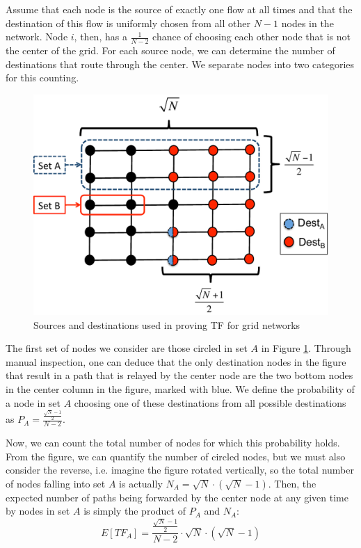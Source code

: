 Assume that each node is the source of exactly one flow at all times and that the destination of this flow is uniformly chosen from all other $N-1$ nodes in the network.  Node $i$, then, has a $\frac{1}{N-2}$ chance of choosing each other node that is not the center of the grid.  For each source node, we can determine the number of destinations that route through the center.  We separate nodes into two categories for this counting.

\begin{figure}
\begin{centering}
    \includegraphics[scale=0.33]{figures/TF_proof_fig_color.pdf}
    \vspace{-4mm}
    \caption{Sources and destinations used in proving TF for grid networks}
    \label{fig:TF_proof_fig}
    \vspace{-6mm}
\end{centering}
\end{figure}

The first set of nodes we consider are those circled in set $A$ in Figure \ref{fig:TF_proof_fig}.  Through manual inspection, one can deduce that the only destination nodes in the figure that result in a path that is relayed by the center node are the two bottom nodes in the center column in the figure, marked with blue.  We define the probability of a node in set $A$ choosing one of these destinations from all possible destinations as $P_{A} = \frac{\frac{\sqrt{N}-1}{2}}{N-2}$.

Now, we can count the total number of nodes for which this probability holds.  From the figure, we can quantify the number of circled nodes, but we must also consider the reverse, i.e. imagine the figure rotated vertically, so the total number of nodes falling into set $A$ is actually $N_A = \sqrt{N} \cdot (\sqrt{N}-1)$.
Then, the expected number of paths being forwarded by the center node at any given time by nodes in set $A$ is simply the product of $P_A$ and $N_A$:
\begin{equation}
	E[TF_{A}] = \frac{\frac{\sqrt{N}-1}{2}}{N-2}  \cdot  \sqrt{N} \cdot (\sqrt{N}-1)
\end{equation}

